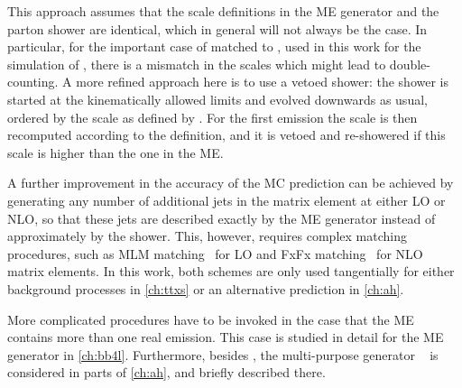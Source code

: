 This approach assumes that the scale definitions in the ME generator and the parton shower are identical, which in general will not always be the case. In particular, for the important case of \powheg matched to \pythia, used in this work for the simulation of \pptt, there is a mismatch in the scales which might lead to double-counting. A more refined approach here is to use a vetoed shower: the shower is started at the kinematically allowed limits and evolved downwards as usual, ordered by the scale as defined by \pythia. For the first emission the scale is then recomputed according to the \powheg definition, and it is vetoed and re-showered if this scale is higher than the one in the ME.

A further improvement in the accuracy of the MC prediction can be achieved by generating any number of additional jets in the matrix element at either LO or NLO, so that these jets are described exactly by the ME generator instead of approximately by the shower. This, however, requires complex matching procedures, such as MLM matching~\cite{Mangano:2006rw} for LO and FxFx matching~\cite{Frederix:2012ps} for NLO matrix elements. In this work, both schemes are only used tangentially for either background processes in \cref{ch:ttxs} or an alternative \ttbar prediction in \cref{ch:ah}.

More complicated procedures have to be invoked in the case that the ME contains more than one real emission. This case is studied in detail for the ME generator \bbfourl in \cref{ch:bb4l}. Furthermore, besides \pythia, the multi-purpose generator \herwig~\cite{Bellm:2015jjp,Bahr:2008pv} is considered in parts of \cref{ch:ah}, and briefly described there.




